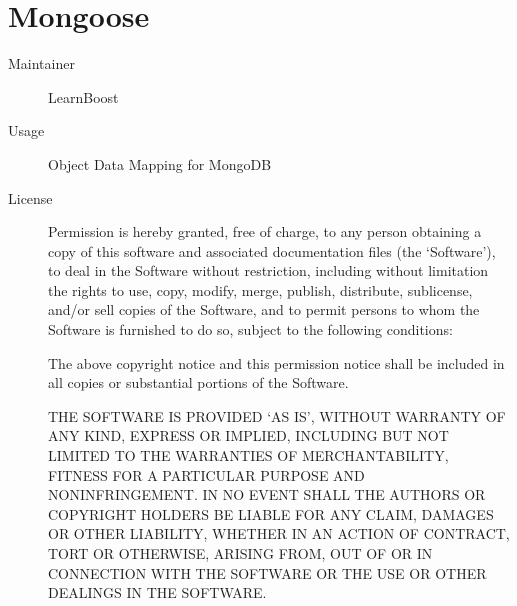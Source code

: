   \section*{Mongoose}
    \begin{description}
      \item[Maintainer] LearnBoost
      \item[Usage] Object Data Mapping for MongoDB
      \item[License] \scriptsize Permission is hereby granted, free of charge, to any person obtaining a copy of this software and associated documentation files (the `Software'), to deal in the Software without restriction, including without limitation the rights to use, copy, modify, merge, publish, distribute, sublicense, and/or sell copies of the Software, and to permit persons to whom the Software is furnished to do so, subject to the following conditions:

      The above copyright notice and this permission notice shall be included in all copies or substantial portions of the Software.

      THE SOFTWARE IS PROVIDED `AS IS', WITHOUT WARRANTY OF ANY KIND, EXPRESS OR IMPLIED, INCLUDING BUT NOT LIMITED TO THE WARRANTIES OF MERCHANTABILITY, FITNESS FOR A PARTICULAR PURPOSE AND NONINFRINGEMENT. IN NO EVENT SHALL THE AUTHORS OR COPYRIGHT HOLDERS BE LIABLE FOR ANY CLAIM, DAMAGES OR OTHER LIABILITY, WHETHER IN AN ACTION OF CONTRACT, TORT OR OTHERWISE, ARISING FROM, OUT OF OR IN CONNECTION WITH THE SOFTWARE OR THE USE OR OTHER DEALINGS IN THE SOFTWARE.
    \end{description}

